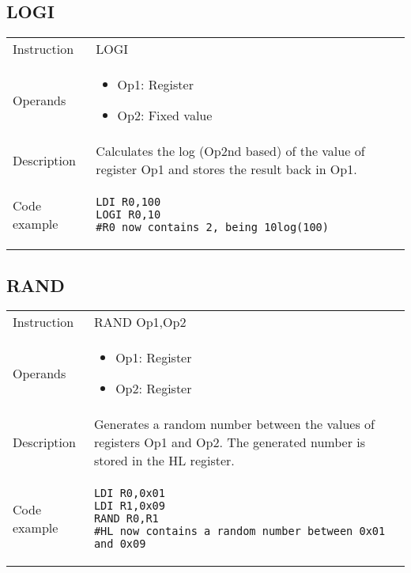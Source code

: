 \subsection{LOGI}
\renewcommand*{\arraystretch}{2.0}
\begin{longtable}{P{3cm}P{9cm}}
\midrule
\noindent Instruction & LOGI  \\
\noindent Operands &
\begin{itemize}[label={},noitemsep,leftmargin=*,topsep=0pt,partopsep=0pt, itemsep=1em]
\item Op1: Register
\item Op2: Fixed value
\end{itemize}\\
\noindent Description & Calculates the log (Op2nd based) of the value of register Op1 and stores the result back in Op1.
	 \\
\noindent Code example & 
\begin{lstlisting}
LDI R0,100
LOGI R0,10
#R0 now contains 2, being 10log(100)
\end{lstlisting} \\
\end{longtable}

\newpage

\subsection{RAND}
\renewcommand*{\arraystretch}{2.0}
\begin{longtable}{P{3cm}P{9cm}}
\midrule
\noindent Instruction & RAND Op1,Op2 \\
\noindent Operands &
\begin{itemize}[label={},noitemsep,leftmargin=*,topsep=0pt,partopsep=0pt, itemsep=1em]
\item Op1: Register
\item Op2: Register
\end{itemize}\\
\noindent Description & Generates a random number between the values of registers Op1 and Op2. The generated number is stored in the HL register.
	 \\
\noindent Code example & 
\begin{lstlisting}
LDI R0,0x01
LDI R1,0x09
RAND R0,R1
#HL now contains a random number between 0x01 and 0x09
\end{lstlisting} \\
\end{longtable}


